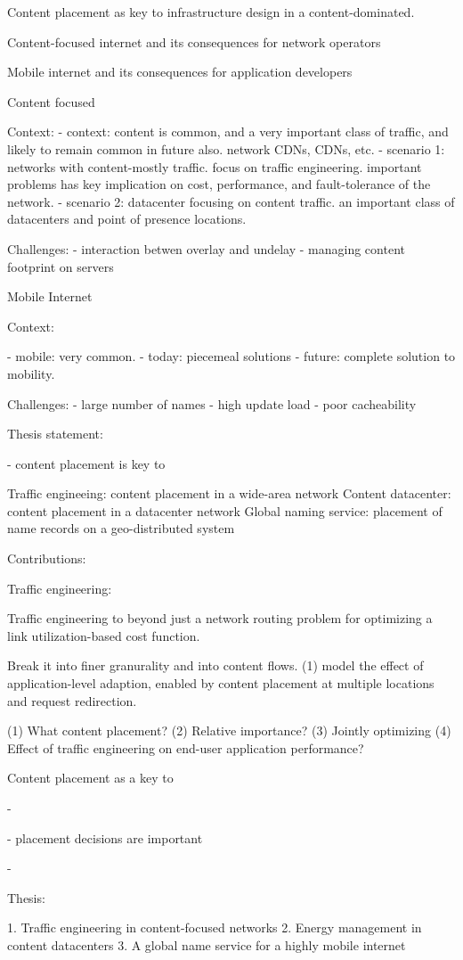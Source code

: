 Content placement as key to infrastructure design in a content-dominated.
 
Content-focused internet and its consequences for network operators

Mobile internet and its consequences for application developers


Content focused

Context:
- context: content is common, and a very important class of traffic, and likely to remain common in future also. network CDNs, CDNs, etc.
- scenario 1: networks with content-mostly traffic. focus on traffic engineering. important problems has key implication on cost, performance, and fault-tolerance of the network. 
- scenario 2: datacenter focusing on content traffic. an important class of datacenters and point of presence locations. 

Challenges: 
- interaction betwen overlay and undelay
- managing content footprint on servers



Mobile Internet

Context:

- mobile: very common.
- today: piecemeal solutions
- future: complete solution to mobility.



Challenges:
- large number of names
- high update load
- poor cacheability



Thesis statement:

- content placement is key to 

Traffic engineeing: content placement in a wide-area network
Content datacenter: content placement in a datacenter network
Global naming service: placement of name records on a geo-distributed system


Contributions:

Traffic engineering:


Traffic engineering to beyond just a network routing problem for optimizing a link utilization-based cost function. 


Break it into finer granurality and into content flows. 
(1) model the effect of application-level adaption, enabled by content placement at multiple locations and request redirection.

(1) What content placement?
(2) Relative importance?
(3) Jointly optimizing
(4) Effect of traffic engineering on end-user application performance?






Content placement as a key to 

- 

- placement decisions are important

- 

Thesis: 

1. Traffic engineering in content-focused networks
2. Energy management in content datacenters
3. A global name service for a highly mobile internet

